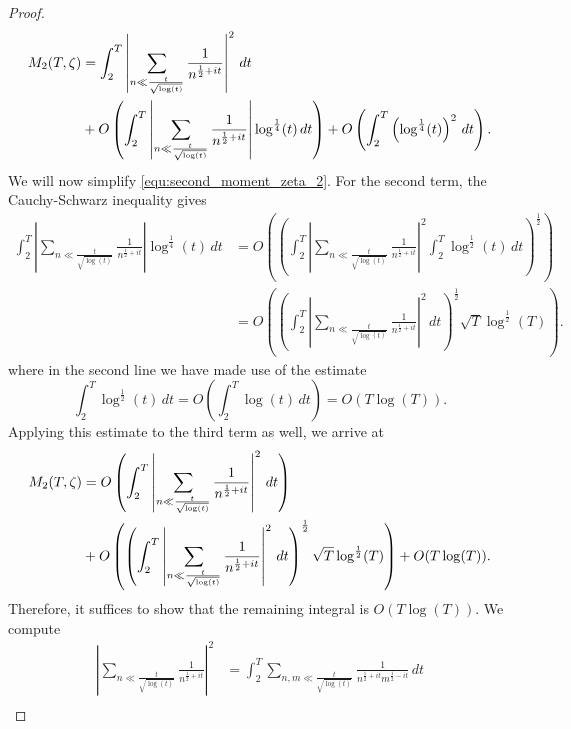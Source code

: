\begin{proof}
\begin{equation}
        \begin{aligned}
          M_{2}(T,\zeta) &= \int_{2}^{T}\left|\sum_{n \ll \frac{t}{\sqrt{\log(t)}}}\frac{1}{n^{\frac{1}{2}+it}}\right|^{2}\,dt \\
          &+ O\left(\int_{2}^{T}\left|\sum_{n \ll \frac{t}{\sqrt{\log(t)}}}\frac{1}{n^{\frac{1}{2}+it}}\right|\log^{\frac{1}{4}}(t)\,dt\right)+O\left(\int_{2}^{T}\left(\log^{\frac{1}{4}}(t)\right)^{2}\,dt\right).
        \end{aligned}
      \end{equation}
      We will now simplify \cref{equ:second_moment_zeta_2}. For the second term, the Cauchy-Schwarz inequality gives
      \begin{align*}
        \int_{2}^{T}\left|\sum_{n \ll \frac{t}{\sqrt{\log(t)}}}\frac{1}{n^{\frac{1}{2}+it}}\right|\log^{\frac{1}{4}}(t)\,dt &= O\left(\left(\int_{2}^{T}\left|\sum_{n \ll \frac{t}{\sqrt{\log(t)}}}\frac{1}{n^{\frac{1}{2}+it}}\right|^{2}\int_{2}^{T}\log^{\frac{1}{2}}(t)\,dt\right)^{\frac{1}{2}}\right) \\
        &= O\left(\left(\int_{2}^{T}\left|\sum_{n \ll \frac{t}{\sqrt{\log(t)}}}\frac{1}{n^{\frac{1}{2}+it}}\right|^{2}\,dt\right)^{\frac{1}{2}}\sqrt{T}\log^{\frac{1}{2}}(T)\right).
      \end{align*}
      where in the second line we have made use of the estimate
      \[
        \int_{2}^{T}\log^{\frac{1}{2}}(t)\,dt = O\left(\int_{2}^{T}\log(t)\,dt\right) = O(T\log(T)).
      \]
      Applying this estimate to the third term as well, we arrive at
      \begin{equation}\label{equ:second_moment_zeta_3}
        \begin{aligned}
          M_{2}(T,\zeta) &= O\left(\int_{2}^{T}\left|\sum_{n \ll \frac{t}{\sqrt{\log(t)}}}\frac{1}{n^{\frac{1}{2}+it}}\right|^{2}\,dt\right) \\
          &+ O\left(\left(\int_{2}^{T}\left|\sum_{n \ll \frac{t}{\sqrt{\log(t)}}}\frac{1}{n^{\frac{1}{2}+it}}\right|^{2}\,dt\right)^{\frac{1}{2}}\sqrt{T}\log^{\frac{1}{2}}(T)\right)+O(T\log(T)).
        \end{aligned}
      \end{equation}
      Therefore, it suffices to show that the remaining integral is $O(T\log(T))$. We compute
      \begin{align*}
        \left|\sum_{n \ll \frac{t}{\sqrt{\log(t)}}}\frac{1}{n^{\frac{1}{2}+it}}\right|^{2} &= \int_{2}^{T}\sum_{n,m \ll \frac{t}{\sqrt{\log(t)}}}\frac{1}{n^{\frac{1}{2}+it}m^{\frac{1}{2}-it}}\,dt \\

\end{align*}
\end{proof}
